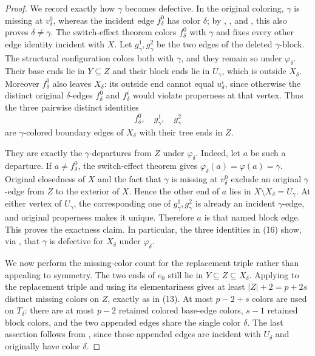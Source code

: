 \begin{proof}
We record exactly how $\gamma$ becomes defective.  In the original
coloring, $\gamma$ is missing at $v^0_\delta$, whereas the incident edge
$f^0_\delta$ has color $\delta$; by
, , and
, this also proves $\delta\ne\gamma$.
The switch-effect theorem colors $f^0_\delta$ with $\gamma$ and fixes
every other edge identity incident with $X$.  Let
$g^1_\gamma,g^2_\gamma$ be the two edges of the deleted $\gamma$-block.
The structural configuration colors both with $\gamma$, and they remain
so under $\varphi_\delta$.  Their base ends lie in $Y\subseteq Z$ and
their block ends lie in $U_\gamma$, which is outside $X_\delta$.
Moreover $f^0_\delta$ also leaves $X_\delta$: its outside end cannot equal
$u^i_\delta$, since otherwise the distinct original $\delta$-edges
$f^0_\delta$ and $f^i_\delta$ would violate properness at that vertex.
Thus the three pairwise distinct identities
\[
 f^0_\delta,\quad g^1_\gamma,\quad g^2_\gamma \tag{16}
\]
are $\gamma$-colored boundary edges of $X_\delta$ with their tree ends
in $Z$.

They are exactly the $\gamma$-departures from $Z$ under
$\varphi_\delta$.  Indeed, let $a$ be such a departure.  If
$a\ne f^0_\delta$, the switch-effect theorem gives
$\varphi_\delta(a)=\varphi(a)=\gamma$.  Original closedness of $X$ and
the fact that $\gamma$ is missing at $v^0_\delta$ exclude an original
$\gamma$-edge from $Z$ to the exterior of $X$.  Hence the other end of
$a$ lies in $X\setminus X_\delta=U_\gamma$.  At either vertex of
$U_\gamma$, the corresponding one of $g^1_\gamma,g^2_\gamma$ is already
an incident $\gamma$-edge, and original properness makes it unique.
Therefore $a$ is that named block edge.  This proves the exactness claim.
In particular, the three identities in (16) show, via
, that $\gamma$ is defective for
$X_\delta$ under $\varphi_\delta$.

We now perform the missing-color count for the replacement triple rather
than appealing to symmetry.  The two ends of $e_0$ still lie in
$Y\subseteq Z\subseteq X_\delta$.  Applying
 to the replacement triple and
using its elementariness gives at least
$|Z|+2=p+2s$ distinct missing colors on $Z$, exactly as in (13).  At most
$p-2+s$ colors are used on $T_\delta$: there are at most $p-2$ retained
colored base-edge colors, $s-1$ retained block colors, and the two appended
edges share the single color $\delta$.  The last assertion follows from
, since those appended edges are
incident with $U_\delta$ and originally have color $\delta$.


\end{proof}
